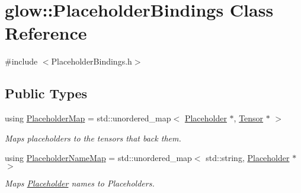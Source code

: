 \hypertarget{classglow_1_1_placeholder_bindings}{}\section{glow\+:\+:Placeholder\+Bindings Class Reference}
\label{classglow_1_1_placeholder_bindings}


{\ttfamily \#include $<$Placeholder\+Bindings.\+h$>$}

\subsection*{Public Types}
\begin{DoxyCompactItemize}
\item 
\mbox{\label{classglow_1_1_placeholder_bindings_ae0ff382e6d2719f72120f35909dd1862}} 
using \hyperlink{classglow_1_1_placeholder_bindings_ae0ff382e6d2719f72120f35909dd1862}{Placeholder\+Map} = std\+::unordered\+\_\+map$<$ \hyperlink{classglow_1_1_placeholder}{Placeholder} $\ast$, \hyperlink{classglow_1_1_tensor}{Tensor} $\ast$ $>$
\begin{DoxyCompactList}\small\item\em Maps placeholders to the tensors that back them. \end{DoxyCompactList}\item 
\mbox{\label{classglow_1_1_placeholder_bindings_aeaa4cf5f6bc00b52420eefe8f15a4d7f}} 
using \hyperlink{classglow_1_1_placeholder_bindings_aeaa4cf5f6bc00b52420eefe8f15a4d7f}{Placeholder\+Name\+Map} = std\+::unordered\+\_\+map$<$ std\+::string, \hyperlink{classglow_1_1_placeholder}{Placeholder} $\ast$ $>$
\begin{DoxyCompactList}\small\item\em Maps \hyperlink{classglow_1_1_placeholder}{Placeholder} names to Placeholders. \end{DoxyCompactList}\end{DoxyCompactItemize}
